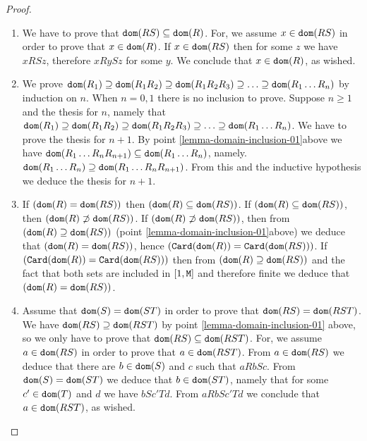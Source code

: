 \documentclass{lmcs}
\begin{document}
\begin{proof}
\begin{enumerate}

\item
We have to prove that ${\tt dom}(RS) \subseteq {\tt dom}(R)$. For, we assume $x \in {\tt dom}(RS)$ in 
order to prove that $x \in {\tt dom}(R)$. If $x \in {\tt dom}(RS)$ then for some $z$ we have $x RS z$, 
therefore $x R y S z$ for some $y$. We conclude that $x \in {\tt dom}(R)$, as wished.

\item
We prove 
$
{\tt dom}(R_1) \supseteq 
{\tt dom}(R_1 R_2) \supseteq 
{\tt dom}(R_1 R_2 R_3) \supseteq 
\ldots \supseteq 
{\tt dom}(R_1 \ldots R_n)
$ 
by induction on $n$. 
When $n=0,1$ there is no inclusion to prove. Suppose $n \ge 1$ and the thesis 
for $n$, namely that ${\tt dom}(R_1) \supseteq {\tt dom}(R_1 R_2) \supseteq {\tt dom}(R_1 R_2 R_3) 
\supseteq \ldots \supseteq {\tt dom}(R_1 \ldots R_n)$. We have to prove the thesis for $n+1$. 
By point \ref{lemma-domain-inclusion-01}above 
we have ${\tt dom}(R_1 \ldots R_{n} R_{n+1}) \subseteq {\tt dom}(R_1 \ldots R_{n})$, namely. 
${\tt dom}(R_1 \ldots R_{n}) \supseteq {\tt dom}(R_1 \ldots R_{n} R_{n+1})$. 
From this and the inductive hypothesis we deduce the thesis for $n+1$.

\item
If $({\tt dom}(R) = {\tt dom}(RS))$ then $({\tt dom}(R) \subseteq {\tt dom}(RS))$. If
$({\tt dom}(R) \subseteq {\tt dom}(RS))$, then $({\tt dom}(R) \not \supset {\tt dom}(RS))$.
If $({\tt dom}(R) \not \supset {\tt dom}(RS))$, then from $({\tt dom}(R) \supseteq {\tt dom}(RS))$
(point \ref{lemma-domain-inclusion-01}above) we deduce that $({\tt dom}(R) = {\tt dom}(RS))$,
hence $({\tt Card}({\tt dom}(R)) = {\tt Card}({\tt dom}(RS)))$. If $({\tt Card}({\tt dom}(R)) = {\tt Card}({\tt dom}(RS)))$
then from $({\tt dom}(R) \supseteq {\tt dom}(RS))$ and the fact that both sets are included in
$[1,{\tt M}]$ and therefore finite we deduce that $({\tt dom}(R) = {\tt dom}(RS))$.

\item
Assume that ${\tt dom}(S) = {\tt dom}(ST)$ in order to prove that 
${\tt dom}(RS) = {\tt dom}(RST)$. 
We have ${\tt dom}(RS) \supseteq {\tt dom}(RST)$ by point \ref{lemma-domain-inclusion-01} above,
so we only have to prove that ${\tt dom}(RS) \subseteq {\tt dom}(RST)$.
For, we assume $a \in {\tt dom}(RS)$ in order to prove that $a \in {\tt dom}(RST)$. 
From $a \in {\tt dom}(RS)$ we deduce that there are $b \in {\tt dom}(S)$ and $c$ such that $a R b S c$. 
From  ${\tt dom}(S) = {\tt dom}(ST)$ we deduce that $b \in {\tt dom}(ST)$, namely that
for some $c' \in {\tt dom}(T)$ and $d$ we have $b S c' T d$. From $a R b S c' T d$ we conclude
that $a \in {\tt dom}(RST)$, as wished.

\end{enumerate}
\end{proof}
\end{document}
